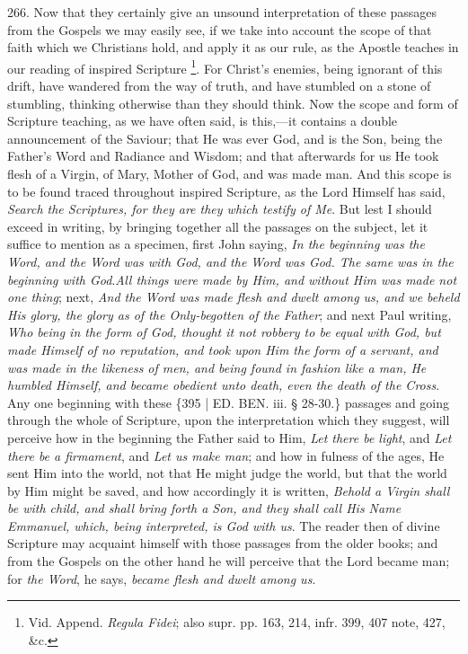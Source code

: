 266.
Now that they certainly give an unsound interpretation of these
passages from the Gospels we may easily see, if we take into account
the scope of that faith which we Christians hold, and apply it as our
rule, as the Apostle teaches in our reading of inspired Scripture \footnote{Vid. Append. \emph{Regula Fidei}; also supr. pp. 163, 214, infr. 399,
407 note, 427, \&c.}. For Christ's enemies, being ignorant of this drift, have
wandered from the way of truth, and have stumbled on a stone of
stumbling, thinking otherwise than they should think. Now the scope
and form of Scripture teaching, as we have often said, is this,—it
contains a double announcement of the Saviour; that He was ever God,
and is the Son, being the Father's Word and Radiance and Wisdom; and
that afterwards for us He took flesh of a Virgin, of Mary, Mother of
God, and was made man. And this scope is to be found traced throughout
inspired Scripture, as the Lord Himself has said, \emph{Search the
Scriptures, for they are they which testify of Me}. But lest I
should exceed in writing, by bringing together all the passages on the
subject, let it suffice to mention as a specimen, first John saying, \emph{In
the beginning was the Word, and the Word was with God, and the Word
was God. The same was in the beginning with God}.\emph{All things
were made by Him, and without Him was made not one thing}; next, \emph{And
the Word was made flesh and dwelt among us, and we beheld His glory,
the glory as of the Only-begotten of the Father}; and next Paul
writing, \emph{Who being in the form of God, thought it not robbery to be
equal with God, but made Himself of no reputation, and took upon Him
the form of a servant, and was made in the likeness of men, and being
found in fashion like a man, He humbled Himself, and became obedient
unto death, even the death of the Cross}. Any one beginning with
these \{395 | ED. BEN. iii. § 28-30.\}
passages and going through the whole of Scripture, upon the
interpretation which they suggest, will perceive how in the beginning
the Father said to Him, \emph{Let there be light}, and \emph{Let there be
a firmament}, and \emph{Let us make man}; and how in fulness of the
ages, He sent Him into the world, not that He might judge the world,
but that the world by Him might be saved, and how accordingly it is
written, \emph{Behold a Virgin shall be with child, and shall bring forth
a Son, and they shall call His Name Emmanuel, which, being
interpreted, is God with us}. The reader then of divine Scripture
may acquaint himself with those passages from the older books; and
from the Gospels on the other hand he will perceive that the Lord
became man; for \emph{the Word}, he says, \emph{became flesh and dwelt
among us}.

